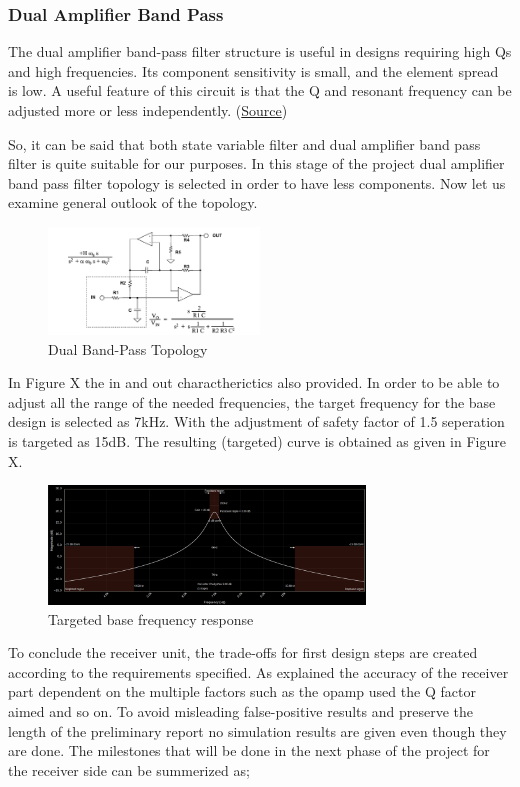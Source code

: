 \documentclass[letterpaper,12pt]{article}
\begin{document}
\subsubsection{Dual Amplifier Band Pass}

The dual amplifier band-pass filter structure is useful in designs requiring high Qs and high frequencies. Its component sensitivity is small, and the element spread is low. A useful feature of this circuit is that the Q and resonant frequency can be adjusted more or less independently. (\href{https://www.analog.com/media/en/training-seminars/tutorials/MT-209.pdf}{Source})

\vspace{2mm}
So, it can be said that both state variable filter and dual amplifier band pass filter is quite suitable for our purposes. In this stage of the project dual amplifier band pass filter topology is selected in order to have less components. Now let us examine general outlook of the topology.
\begin{figure}[h]
    \centering
    \includegraphics[width = 0.5\textwidth]{dualbandpass.png}
    \caption{Dual Band-Pass Topology}
\end{figure} 
In Figure X the in and out charactherictics also provided. In order to be able to adjust all the range of the needed frequencies, the target frequency for the base design is selected as 7kHz. With the adjustment of safety factor of 1.5 seperation is targeted as 15dB. The resulting (targeted) curve is obtained as given in Figure X.
\begin{figure}[h]
    \centering
    \includegraphics[width = 0.75\textwidth]{response.png}
    \caption{Targeted base frequency response}
\end{figure} 
To conclude the receiver unit, the trade-offs for first design steps are created according to the requirements specified. As explained the accuracy of the receiver part dependent on the multiple factors such as the opamp used the Q factor aimed and so on. To avoid misleading false-positive results and preserve the length of the preliminary report no simulation results are given even though they are done. The milestones that will be done in the next phase of the project for the receiver side can be summerized as;
\end{document}
